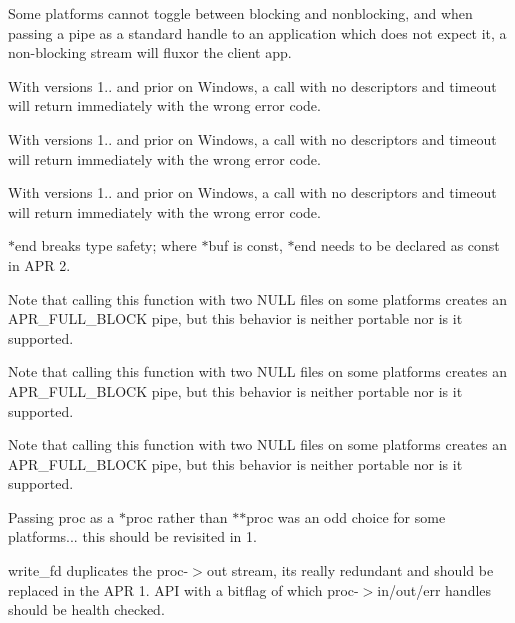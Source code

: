 
\begin{DoxyRefList}
\item[\label{bug__bug000002}%
\Hypertarget{bug__bug000002}%
Member \mbox{\hyperlink{group__apr__time_ga57bfe39a9516843a151a65cd02f84616}{A\+P\+R\+\_\+\+D\+E\+C\+L\+A\+RE}} (apr\+\_\+status\+\_\+t) apr\+\_\+time\+\_\+ansi\+\_\+put(apr\+\_\+time\+\_\+t $\ast$result]Some platforms cannot toggle between blocking and nonblocking, and when passing a pipe as a standard handle to an application which does not expect it, a non-\/blocking stream will fluxor the client app. 

With versions 1.. and prior on Windows, a call with no descriptors and timeout will return immediately with the wrong error code. 

With versions 1.. and prior on Windows, a call with no descriptors and timeout will return immediately with the wrong error code. 

With versions 1.. and prior on Windows, a call with no descriptors and timeout will return immediately with the wrong error code. 

$\ast$end breaks type safety; where $\ast$buf is const, $\ast$end needs to be declared as const in A\+PR 2. 

Note that calling this function with two N\+U\+LL files on some platforms creates an A\+P\+R\+\_\+\+F\+U\+L\+L\+\_\+\+B\+L\+O\+CK pipe, but this behavior is neither portable nor is it supported.

Note that calling this function with two N\+U\+LL files on some platforms creates an A\+P\+R\+\_\+\+F\+U\+L\+L\+\_\+\+B\+L\+O\+CK pipe, but this behavior is neither portable nor is it supported.

Note that calling this function with two N\+U\+LL files on some platforms creates an A\+P\+R\+\_\+\+F\+U\+L\+L\+\_\+\+B\+L\+O\+CK pipe, but this behavior is neither portable nor is it supported.

Passing proc as a $\ast$proc rather than $\ast$$\ast$proc was an odd choice for some platforms... this should be revisited in 1.  
\item[\label{bug__bug000011}%
\Hypertarget{bug__bug000011}%
Member \mbox{\hyperlink{group__apr__time_ga82e8a0064bc8dd25ef73f39ea428a585}{A\+P\+R\+\_\+\+D\+E\+C\+L\+A\+RE}} (void) apr\+\_\+sleep(apr\+\_\+interval\+\_\+time\+\_\+t t)]write\+\_\+fd duplicates the proc-\/$>$out stream, it\textquotesingle{}s really redundant and should be replaced in the A\+PR 1. A\+PI with a bitflag of which proc-\/$>$in/out/err handles should be health checked. 


\end{DoxyRefList}
